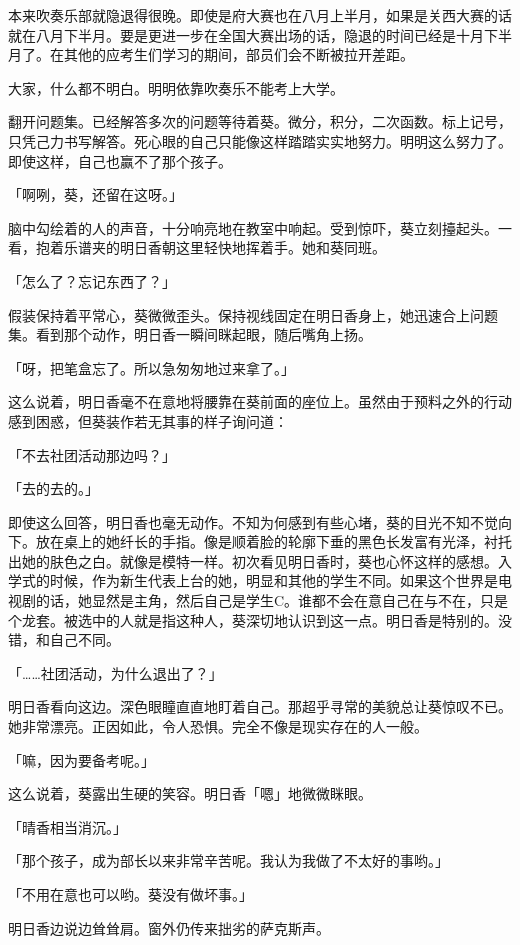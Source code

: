\documentclass[UTF8]{ctexart}
\begin{document}
    本来吹奏乐部就隐退得很晚。即使是府大赛也在八月上半月，如果是关西大赛的话就在八月下半月。要是更进一步在全国大赛出场的话，隐退的时间已经是十月下半月了。在其他的应考生们学习的期间，部员们会不断被拉开差距。

    大家，什么都不明白。明明依靠吹奏乐不能考上大学。

    翻开问题集。已经解答多次的问题等待着葵。微分，积分，二次函数。标上记号，只凭己力书写解答。死心眼的自己只能像这样踏踏实实地努力。明明这么努力了。即使这样，自己也赢不了那个孩子。

    「啊咧，葵，还留在这呀。」

    脑中勾绘着的人的声音，十分响亮地在教室中响起。受到惊吓，葵立刻擡起头。一看，抱着乐谱夹的明日香朝这里轻快地挥着手。她和葵同班。

    「怎么了？忘记东西了？」

    假装保持着平常心，葵微微歪头。保持视线固定在明日香身上，她迅速合上问题集。看到那个动作，明日香一瞬间眯起眼，随后嘴角上扬。

    「呀，把笔盒忘了。所以急匆匆地过来拿了。」

    这么说着，明日香毫不在意地将腰靠在葵前面的座位上。虽然由于预料之外的行动感到困惑，但葵装作若无其事的样子询问道：

    「不去社团活动那边吗？」

    「去的去的。」

    即使这么回答，明日香也毫无动作。不知为何感到有些心堵，葵的目光不知不觉向下。放在桌上的她纤长的手指。像是顺着脸的轮廓下垂的黑色长发富有光泽，衬托出她的肤色之白。就像是模特一样。初次看见明日香时，葵也心怀这样的感想。入学式的时候，作为新生代表上台的她，明显和其他的学生不同。如果这个世界是电视剧的话，她显然是主角，然后自己是学生C。谁都不会在意自己在与不在，只是个龙套。被选中的人就是指这种人，葵深切地认识到这一点。明日香是特别的。没错，和自己不同。

    「……社团活动，为什么退出了？」

    明日香看向这边。深色眼瞳直直地盯着自己。那超乎寻常的美貌总让葵惊叹不已。她非常漂亮。正因如此，令人恐惧。完全不像是现实存在的人一般。

    「嘛，因为要备考呢。」

    这么说着，葵露出生硬的笑容。明日香「嗯」地微微眯眼。

    「晴香相当消沉。」

    「那个孩子，成为部长以来非常辛苦呢。我认为我做了不太好的事哟。」

    「不用在意也可以哟。葵没有做坏事。」

    明日香边说边耸耸肩。窗外仍传来拙劣的萨克斯声。
\end{document}
